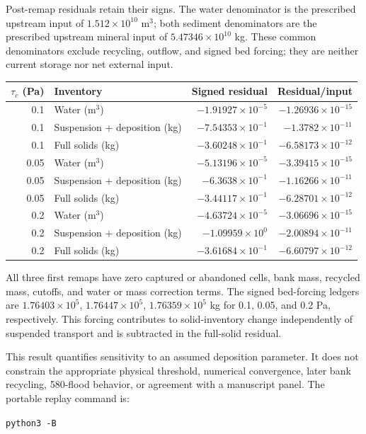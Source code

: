 Post-remap residuals retain their signs. The water denominator is
the prescribed upstream input of $1.512\times10^{10}$ m$^3$; both sediment denominators
are the prescribed upstream mineral input of $5.47346\times10^{10}$ kg.
These common denominators exclude recycling, outflow, and signed bed
forcing; they are neither current storage nor net external input.

\begin{center}\small\setlength{\tabcolsep}{4pt}
\begin{tabular}{rlrr}
\toprule
$\tau_c$ (Pa) & Inventory & Signed residual & Residual/input \\
\midrule
0.1 & Water (m$^3$) & $-1.91927\times10^{-5}$ & $-1.26936\times10^{-15}$ \\
0.1 & Suspension + deposition (kg) & $-7.54353\times10^{-1}$ & $-1.3782\times10^{-11}$ \\
0.1 & Full solids (kg) & $-3.60248\times10^{-1}$ & $-6.58173\times10^{-12}$ \\
0.05 & Water (m$^3$) & $-5.13196\times10^{-5}$ & $-3.39415\times10^{-15}$ \\
0.05 & Suspension + deposition (kg) & $-6.3638\times10^{-1}$ & $-1.16266\times10^{-11}$ \\
0.05 & Full solids (kg) & $-3.44117\times10^{-1}$ & $-6.28701\times10^{-12}$ \\
0.2 & Water (m$^3$) & $-4.63724\times10^{-5}$ & $-3.06696\times10^{-15}$ \\
0.2 & Suspension + deposition (kg) & $-1.09959\times10^{0}$ & $-2.00894\times10^{-11}$ \\
0.2 & Full solids (kg) & $-3.61684\times10^{-1}$ & $-6.60797\times10^{-12}$ \\
\bottomrule\end{tabular}\end{center}
All three first remaps have zero captured or abandoned cells, bank
mass, recycled mass, cutoffs, and water or mass correction terms.
The signed bed-forcing ledgers are $1.76403\times10^{5}$, $1.76447\times10^{5}$, $1.76359\times10^{5}$ kg for 0.1, 0.05, and 0.2 Pa,
respectively. This forcing contributes to solid-inventory change
independently of suspended transport and is subtracted in the
full-solid residual.

This result quantifies sensitivity to an assumed deposition parameter.
It does not constrain the appropriate physical threshold, numerical
convergence, later bank recycling, 580-flood behavior, or agreement
with a manuscript panel.
The portable replay command is:
\par\noindent\texttt{python3 -B}\ 

